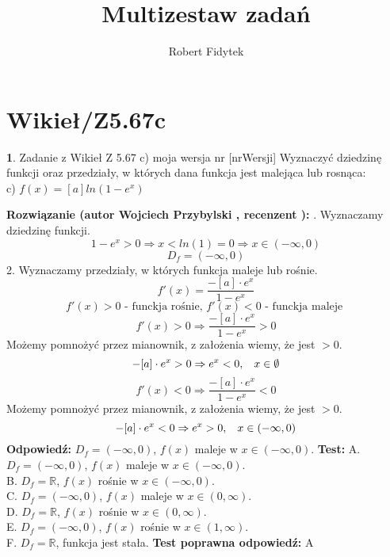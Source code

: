 \documentclass[12pt, a4paper]{article}
\title{Multizestaw zadań}
\author{Robert Fidytek}
\date{}
\theoremstyle{definition} %
\newtheorem{zad}{}
\newcommand{\kategoria}[1]{\section{#1}} %
\newcommand{\zadStart}[1]{\begin{zad}#1\newline} %
\newcommand{\zadStop}{\end{zad}}   %
\newcommand{\rozwStart}[2]{\noindent \textbf{Rozwiązanie (autor #1 , recenzent #2): }\newline} %
\newcommand{\rozwStop}{\newline}                                            %
\newcommand{\odpStart}{\noindent \textbf{Odpowiedź:}\newline}    %
\newcommand{\odpStop}{\newline}                                             %
\newcommand{\testStart}{\noindent \textbf{Test:}\newline} %
\newcommand{\testStop}{\newline} %
\newcommand{\kluczStart}{\noindent \textbf{Test poprawna odpowiedź:}\newline} %
\newcommand{\kluczStop}{\newline} %
\begin{document}
\maketitle


\kategoria{Wikieł/Z5.67c}
\zadStart{Zadanie z Wikieł Z 5.67 c) moja wersja nr [nrWersji]}
Wyznaczyć dziedzinę funkcji oraz przedziały, w których dana funkcja jest malejąca lub rosnąca:\\
c) $f(x)=[a]ln(1-e^{x})$
\zadStop
\rozwStart{Wojciech Przybylski}{}
1. Wyznaczamy dziedzinę funkcji.
$$1-e^{x}>0 \Rightarrow x<ln(1)=0 \Rightarrow x\in(-\infty,0)$$
$$D_{f}=(-\infty,0)$$
2. Wyznaczamy przedziały, w których funkcja maleje lub rośnie. 
$$f'(x)=\frac{-[a]\cdot e^{x}}{1-e^{x}}$$
$$f'(x)>0 \mbox{ - funckja rośnie, } f'(x)<0 \mbox{ - funckja maleje }$$
$$f'(x)>0\Rightarrow \frac{-[a]\cdot e^{x}}{1-e^{x}}>0$$
Możemy pomnożyć przez mianownik, z założenia wiemy, że jest $>0$.
$$-[a]\cdot e^{x}>0 \Rightarrow e^{x}<0, \hspace{3mm} x\in\emptyset$$
$$f'(x)<0\Rightarrow \frac{-[a]\cdot e^{x}}{1-e^{x}}<0 $$
Możemy pomnożyć przez mianownik, z założenia wiemy, że jest $>0$.
$$-[a]\cdot e^{x}<0 \Rightarrow e^{x}>0, \hspace{3mm} x\in(-\infty,0)$$
\rozwStop
\odpStart
$D_{f}=(-\infty,0)$, $f(x)$ maleje w $x\in(-\infty,0)$.
\odpStop
\testStart
A. $D_{f}=(-\infty,0)$, $f(x)$ maleje w $x\in(-\infty,0)$.\\
B. $D_{f}=\mathbb{R}$, $f(x)$ rośnie w $x\in(-\infty,0)$.\\
C. $D_{f}=(-\infty,0)$, $f(x)$ maleje w $x\in(0,\infty)$.\\
D. $D_{f}=\mathbb{R}$, $f(x)$ rośnie w $x\in(0,\infty)$.\\
E. $D_{f}=(-\infty,0)$, $f(x)$ rośnie w $x\in(1,\infty)$.\\
F. $D_{f}=\mathbb{R}$, funkcja jest stała.
\testStop
\kluczStart
A
\kluczStop
\end{document}
